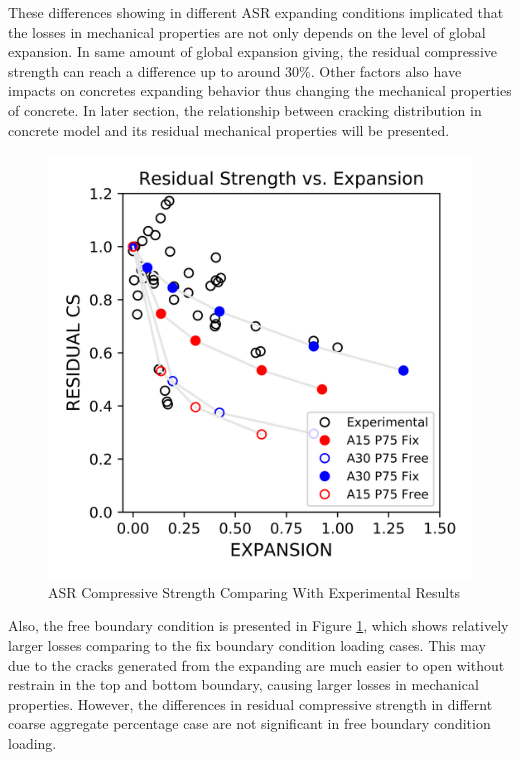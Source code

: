 These differences showing in different ASR expanding conditions implicated that the losses in mechanical properties are not only depends on the level of global expansion. In same amount of global expansion giving, the residual compressive strength can reach a difference up to around 30\%. Other factors also have impacts on concretes expanding behavior thus changing the mechanical properties of concrete. In later section, the relationship between cracking distribution in concrete model and its residual mechanical properties will be presented.

\begin{figure}[ht!]
\centering
\includegraphics[width=.8\linewidth]{Files/CS_plot/ASR_free.png}
  \caption{ASR Compressive Strength Comparing With Experimental Results}
  \label{ASR_Free}
\end{figure}

Also, the free boundary condition is presented in Figure \ref{ASR_Free}, which shows relatively larger losses comparing to the fix boundary condition loading cases. This may due to the cracks generated from the expanding are much easier to open without restrain in the top and bottom boundary, causing larger losses in mechanical properties. However, the differences in residual compressive strength in differnt coarse aggregate percentage case are not significant in free boundary condition loading.
